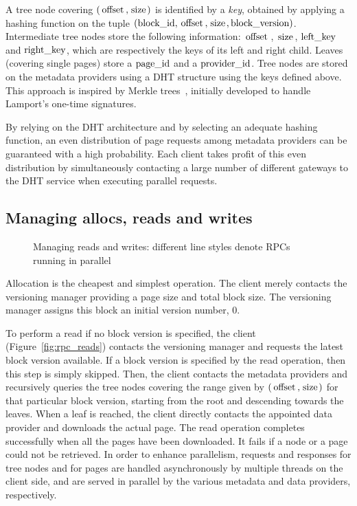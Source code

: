 \documentclass{llncs}
\newcommand{\myblock}[1]{\mbox{\lstinline{#1}}}
\newcommand{\myblockxspace}[1]{\myblock{#1}\xspace}
\newcommand{\Offset}{\myblockxspace{offset}}
\newcommand{\Size}{\myblockxspace{size}}
\newcommand{\Blockid}{\myblockxspace{block_id}}
\newcommand{\Blockversion}{\myblockxspace{block_version}}
\newcommand{\Leftkey}{\myblockxspace{left_key}}
\newcommand{\Rightkey}{\myblockxspace{right_key}}
\newcommand{\Pageid}{\myblockxspace{page_id}}
\newcommand{\Providerid}{\myblockxspace{provider_id}}
\begin{document}
A tree node covering $(\Offset, \Size)$ is identified by a \emph{key},
obtained by applying a hashing function on the tuple $(\Blockid,
\Offset, \Size, \Blockversion)$.  Intermediate tree nodes store the
following information: $\Offset$, $\Size$, $\Leftkey$ and $\Rightkey$,
which are respectively the keys of its left and right child. Leaves
(covering single pages) store a $\Pageid$ and a $\Providerid$.  Tree
nodes are stored on the metadata providers using a DHT structure using
the keys defined above. This approach is inspired by Merkle
trees~\cite{Mer88Signature}, initially developed to handle Lamport's one-time
signatures.

By relying on the DHT architecture and by selecting an adequate hashing
function, an even distribution of page requests among metadata
providers can be guaranteed with a high probability. Each client takes
profit of this even distribution by simultaneously contacting a large
number of different gateways to the DHT service when executing parallel
requests.

\subsection{Managing allocs, reads and writes}
\label{sec:how}

\begin{figure}
\centerline{
\hfill
{}\hfill
{}\hfill
}
\caption{Managing reads and writes: different line styles denote
    RPCs running in parallel}
  \label{fig:Reads and writes}
\end{figure}

Allocation is the cheapest and simplest operation. The client merely
contacts the versioning manager providing a page size and total block
size. The versioning manager assigns this block an initial version number, $0$.



To perform a read if no block version is specified, the client
(Figure~\ref{fig:rpc_reads}) contacts the versioning manager and requests
the latest block version available. If a block version is specified by the
read operation, then this step is simply skipped. Then, the client contacts
the metadata providers and recursively queries  the tree nodes
covering the range given by $(\Offset, \Size)$ for that particular block
version, starting from the root and descending towards the leaves. When
a leaf is reached, the client directly contacts the appointed data provider
and downloads the actual page. The read operation completes
successfully when all the pages have been downloaded. It fails if a node or
a page could not be retrieved.  In order to enhance
parallelism, requests and responses for tree nodes and for pages are
handled asynchronously by multiple threads on the client side, and are
served in parallel by the various metadata and data providers,
respectively.
\end{document}
